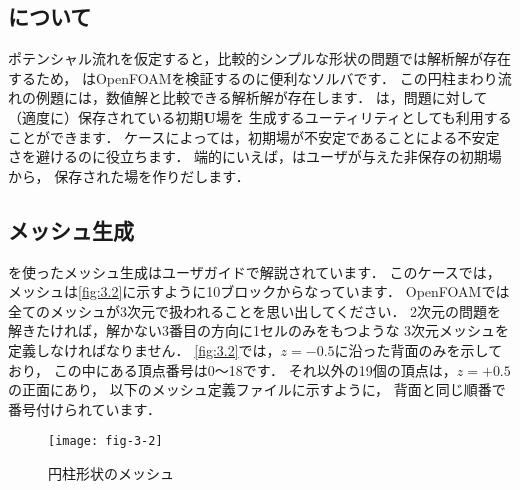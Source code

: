 \subsection{について}
\label{ssec:3.1.2}
ポテンシャル流れを仮定すると，比較的シンプルな形状の問題では解析解が存在するため，
はOpenFOAMを検証するのに便利なソルバです．
この円柱まわり流れの例題には，数値解と比較できる解析解が存在します．
は，問題に対して（適度に）保存されている初期$\bm{U}$場を
生成するユーティリティとしても利用することができます．
ケースによっては，初期場が不安定であることによる不安定さを避けるのに役立ちます．
端的にいえば，はユーザが与えた非保存の初期場から，
保存された場を作りだします．


\subsection{メッシュ生成}
\label{ssec:3.1.3}
%
%
を使ったメッシュ生成はユーザガイドで解説されています．
このケースでは，メッシュは\autoref{fig:3.2}に示すように10ブロックからなっています．
OpenFOAMでは全てのメッシュが3次元で扱われることを思い出してください．
2次元の問題を解きたければ，解かない3番目の方向に1セルのみをもつような
3次元メッシュを定義しなければなりません．
\autoref{fig:3.2}では，$z = -0.5$に沿った背面のみを示しており，
この中にある頂点番号は0〜18です．
それ以外の19個の頂点は，$z = +0.5$の正面にあり，
以下のメッシュ定義ファイルに示すように，
背面と同じ順番で番号付けられています．


\begin{figure}[b]
 \texttt{[image: fig-3-2]}
 \caption{円柱形状のメッシュ}
 \label{fig:3.2}
\end{figure}


